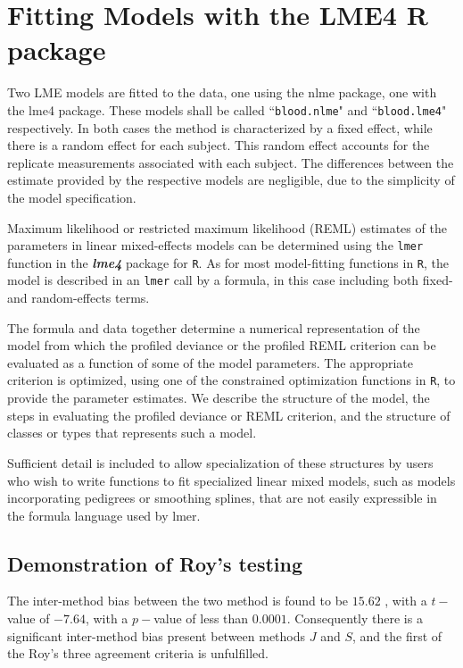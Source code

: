 \documentclass[12pt, a4paper]{report}
\theoremstyle{plain}
\theoremstyle{definition}
\theoremstyle{remark}
\begin{document}
	\section{Fitting Models with the LME4 R package}
	Two LME models are fitted to the data, one using the nlme package, one with the lme4 package. These models shall be called ``\texttt{blood.nlme}" and ``\texttt{blood.lme4}" respectively.
	In both cases the method is characterized by a fixed effect, while there is a random effect for each subject.
	This random effect accounts for the replicate measurements associated with each subject.
	The differences between the estimate provided by the respective models are negligible, due to the simplicity of the model specification.
	
	
	Maximum likelihood or restricted maximum likelihood (REML) estimates of the parameters in linear mixed-effects models can be determined using the \texttt{lmer} function in the \textbf{\textit{lme4}} package for \texttt{R}. As for most model-fitting functions in \texttt{R}, the model is described in an \texttt{lmer} call by a formula, in this case including both fixed- and random-effects terms. 
	
	The formula and data together determine a numerical representation of the model from which the profiled deviance or the profiled REML criterion can be evaluated as a function of some of the model parameters. The appropriate criterion is optimized, using one of the constrained optimization functions in \texttt{R}, to provide the parameter estimates. We describe the structure of the model, the steps in evaluating the profiled deviance or REML criterion, and the structure of classes or types that represents such a model. 
	
	Sufficient detail is included to allow specialization of these structures by users who wish to write functions to fit specialized linear mixed models, such as models incorporating pedigrees or smoothing splines, that are not easily expressible in the formula language used by lmer.
	
	

\subsection{Demonstration of Roy's testing}

	
	The inter-method bias between the two method is found to be $15.62$ , with a $t-$value of $-7.64$, with a $p-$value of less than $0.0001$. Consequently there is a significant inter-method bias present between methods $J$ and $S$, and the first of the Roy's three agreement criteria is unfulfilled.
	
\end{document}
